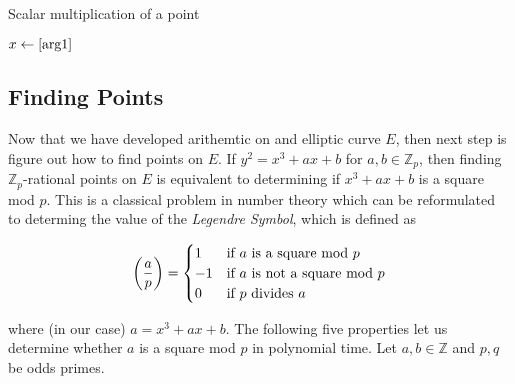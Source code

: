 \begin{algorithm} 
	\caption{Scalar multiplication of a point}
	\begin{algorithmic}[1]
		  	\EndIf
		  	\State $ x \leftarrow \ref{arg1} $
	  	\EndFunction
	\end{algorithmic} 
\end{algorithm} 


\subsection{Finding Points}

Now that we have developed arithemtic on and elliptic curve $E$, then next step is figure out how to find points on $E$. If $y^2 = x^3 + ax + b$ for $a,b \in \mathbb{Z}_p$, then finding $\mathbb{Z}_p$-rational points on $E$ is equivalent to determining if $x^3 + ax + b$ is a square mod $p$. This is a classical problem in number theory which can be reformulated to determing the value of the \textit{Legendre Symbol}, which is defined as 

$$ \left(\frac{a}{p}\right) =
\begin{cases}
1 &\text{if }a \text{ is a square mod } p\\
-1 &\text{if }a \text{ is not a square mod }p\\
0 & \text{if } p \text{ divides }a
\end{cases} 
$$ 

where (in our case) $a = x^3 + ax + b$. The following five properties let us determine whether $a$ is a square mod $p$ in polynomial time. Let $a,b \in \mathbb{Z}$ and $p,q$ be odds primes.

